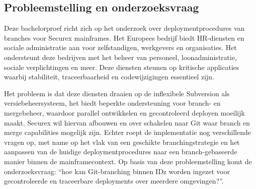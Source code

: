 \subsection{Probleemstelling en onderzoeksvraag}
Deze bachelorproef richt zich op het onderzoek over deploymentprocedures van branches voor Securex mainframes. Het Europees bedrijf biedt HR-diensten en sociale administratie aan voor zelfstandigen, werkgevers en organisaties. Het ondersteunt deze bedrijven met het beheer van personeel, loonadministratie, sociale verplichtingen en meer. Deze diensten steunen op kritische applicaties waarbij stabiliteit, traceerbaarheid en codewijzigingen essentieel zijn. 

Het probleem is dat deze diensten draaien op de inflexibele Subversion als versiebeheersysteem, het biedt beperkte ondersteuning voor branch- en mergebeheer, waardoor parallel ontwikkelen en gecontroleerd deployen moeilijk maakt. Securex wil hiervan afbouwen en over schakelen naar Git waar branch en merge capabilities mogelijk zijn. Echter roept de implementatie nog verschillende vragen op, met name op het vlak van een geschikte branchingstrategie en het aanpassen van de huidige deploymentprocedures naar een branch-gebaseerde manier binnen de mainframecontext. Op basis van deze probleemstelling komt de onderzoeksvraag: ``hoe kan Git-branching binnen IDz worden ingezet voor gecontroleerde en traceerbare deployments over meerdere omgevingen?''.


